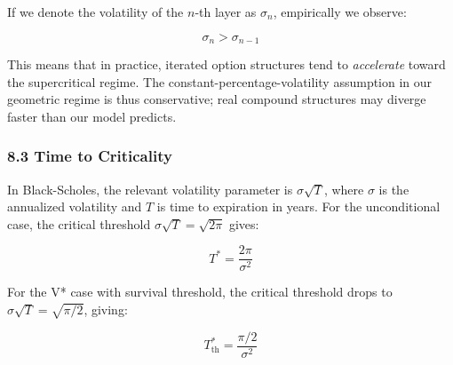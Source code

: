 \documentclass[
  11pt,
  openany]{article}
\begin{document}
If we denote the volatility of the \(n\)-th layer as \(\sigma_n\),
empirically we observe:

\[\sigma_n > \sigma_{n-1}\]

This means that in practice, iterated option structures tend to
\emph{accelerate} toward the supercritical regime. The
constant-percentage-volatility assumption in our geometric regime is
thus conservative; real compound structures may diverge faster than our
model predicts.

\subsubsection{8.3 Time to Criticality}\label{time-to-criticality}

In Black-Scholes, the relevant volatility parameter is
\(\sigma\sqrt{T}\), where \(\sigma\) is the annualized volatility and
\(T\) is time to expiration in years. For the unconditional case, the
critical threshold \(\sigma\sqrt{T} = \sqrt{2\pi}\) gives:

\[T^* = \frac{2\pi}{\sigma^2}\]

For the V* case with survival threshold, the critical threshold drops to
\(\sigma\sqrt{T} = \sqrt{\pi/2}\), giving:

\[T_{\text{th}}^* = \frac{\pi/2}{\sigma^2}\]
\end{document}
